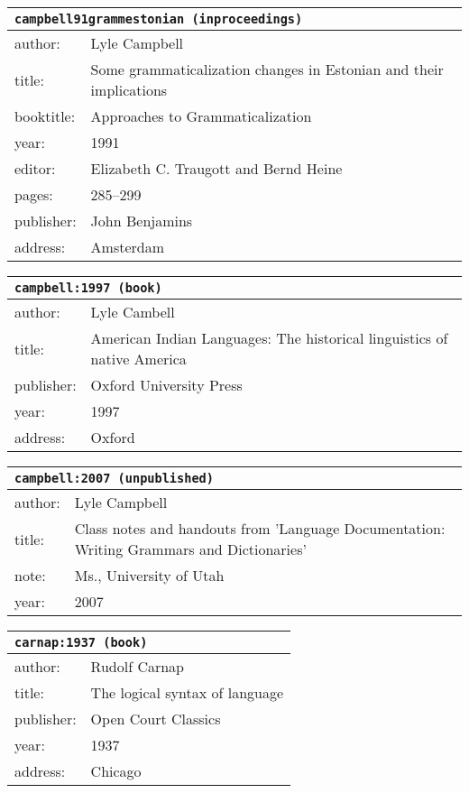 \documentclass{article}
\begin{document}
\bigskip

\begin{tabular}{p{}p{}}
\multicolumn{2}{l}{\texttt{campbell91grammestonian (inproceedings)}}\\
\hline
author: & Lyle Campbell\\
title: & Some grammaticalization changes in Estonian and their implications\\
booktitle: & Approaches to Grammaticalization\\
year: & 1991\\
editor: & Elizabeth C. Traugott and Bernd Heine\\
pages: & 285--299\\
publisher: & John Benjamins\\
address: & Amsterdam\\
\end{tabular}

\bigskip

\begin{tabular}{p{}p{}}
\multicolumn{2}{l}{\texttt{campbell:1997 (book)}}\\
\hline
author: & Lyle Cambell\\
title: & American Indian Languages: The historical linguistics of native America\\
publisher: & Oxford University Press\\
year: & 1997\\
address: & Oxford\\
\end{tabular}

\bigskip

\begin{tabular}{p{}p{}}
\multicolumn{2}{l}{\texttt{campbell:2007 (unpublished)}}\\
\hline
author: & Lyle Campbell\\
title: & Class notes and handouts from 'Language Documentation: Writing Grammars and Dictionaries'\\
note: & \textsc{M}s., University of Utah\\
year: & 2007\\
\end{tabular}

\bigskip

\begin{tabular}{p{}p{}}
\multicolumn{2}{l}{\texttt{carnap:1937 (book)}}\\
\hline
author: & Rudolf Carnap\\
title: & The logical syntax of language\\
publisher: & Open Court Classics\\
year: & 1937\\
address: & Chicago\\
\end{tabular}
\end{document}
